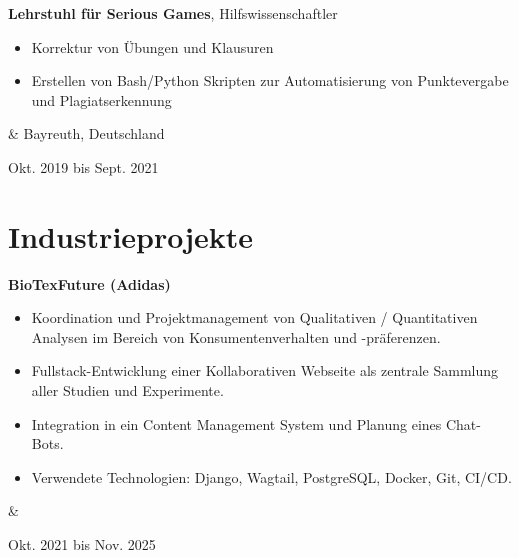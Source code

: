\documentclass[10pt, a4paper]{article}
\newenvironment{highlights}{
        \begin{itemize}[
                topsep=0pt,
                parsep=0.10 cm,
                partopsep=0pt,
                itemsep=0pt,
                after=\vspace{-1\baselineskip},
                leftmargin=0.4 cm + 3pt
            ]
    }{
        \end{itemize}
    } %
\let\originalTabularx\tabularx
\let\originalEndTabularx\endtabularx
\renewenvironment{tabularx}{\bgroup\centering\originalTabularx}{\originalEndTabularx\par\egroup}
\begin{document}
        \vspace{0.2 cm}
        \begin{tabularx}{
            \textwidth-0.4 cm-0.13cm
        }{
            K{0.2 cm}
            R{4.1 cm}
        }
            \textbf{Lehrstuhl für Serious Games}, Hilfswissenschaftler

            \vspace{0.10 cm}

            \begin{highlights}
                \item Korrektur von Übungen und Klausuren
                \item Erstellen von Bash/Python Skripten zur Automatisierung von Punktevergabe und Plagiatserkennung
            \end{highlights}
            &
            Bayreuth, Deutschland

            Okt. 2019 bis Sept. 2021
        \end{tabularx}


    
    \section{Industrieprojekte}

        \begin{tabularx}{
            \textwidth-0.4 cm-0.13cm
        }{
            K{0.2 cm}
            R{4.1 cm}
        }
            \textbf{BioTexFuture (Adidas)}

            \vspace{0.10 cm}

            \begin{highlights}
                \item Koordination und Projektmanagement von Qualitativen / Quantitativen Analysen im Bereich von Konsumentenverhalten und -präferenzen.
                \item Fullstack-Entwicklung einer Kollaborativen Webseite als zentrale Sammlung aller Studien und Experimente.
                \item Integration in ein Content Management System  und Planung eines Chat-Bots.
                \item Verwendete Technologien: Django, Wagtail, PostgreSQL, Docker, Git, CI/CD.
            \end{highlights}
            &
            

            Okt. 2021 bis Nov. 2025
        \end{tabularx}
\end{document}
